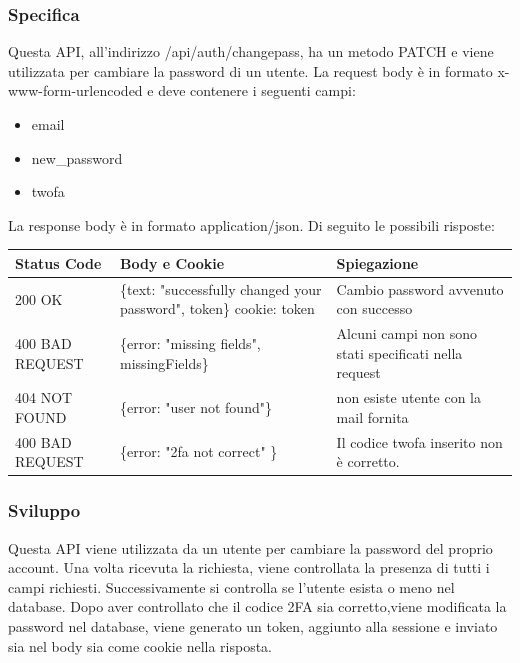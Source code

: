 \documentclass{report}
\begin{document}
\subsubsection*{Specifica}
Questa API, all'indirizzo /api/auth/changepass, ha un metodo PATCH e viene utilizzata per cambiare la password di un utente.
La request body è in formato x-www-form-urlencoded e deve contenere i seguenti campi:
\begin{itemize}
	\item email
	\item new\_password
	\item twofa
\end{itemize}
La response body è in formato application/json. Di seguito le possibili risposte:
\begin{center} %
	\centering
	\begin{tabular}{ |p{4cm}|p{5cm}|p{4cm}| }
		\hline
		\centering Status Code & \qquad\quad Body e Cookie & \qquad\qquad Spiegazione\\ %
		\hline
		200 OK & \{text: "successfully changed your password", token\} cookie: token & Cambio password avvenuto con successo	\\
		\hline
		400 BAD REQUEST & \{error: "missing fields", missingFields\} & Alcuni campi non sono stati specificati nella request\\ %
		\hline
		404 NOT FOUND & \{error: "user not found"\} & non esiste utente con la mail fornita \\%
		\hline
		400 BAD REQUEST & \{error: "2fa not correct" \} & Il codice twofa inserito non è corretto. \\
		\hline
	\end{tabular}
\end{center}
\subsubsection*{Sviluppo}
Questa API viene utilizzata da un utente per cambiare la password del proprio account.
Una volta ricevuta la richiesta, viene controllata la presenza di tutti i campi richiesti.
Successivamente si controlla se l'utente esista o meno nel database.
Dopo aver controllato che il codice 2FA sia corretto,viene modificata la password nel database, viene generato un token, aggiunto alla sessione e inviato sia nel body sia come cookie nella risposta.
\end{document}
